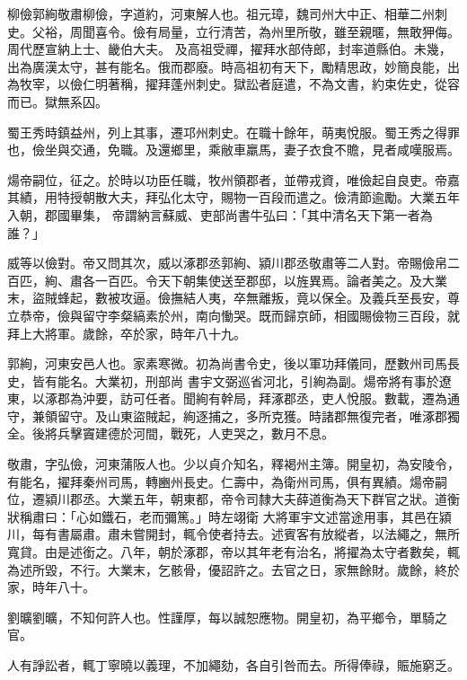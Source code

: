 \begin{pinyinscope}
 柳儉郭絢敬肅柳儉，字道約，河東解人也。祖元璋，魏司州大中正、相華二州刺史。父裕，周聞喜令。儉有局量，立行清苦，為州里所敬，雖至親暱，無敢狎侮。周代歷宣納上士、畿伯大夫。
 及高祖受禪，擢拜水部侍郎，封率道縣伯。未幾，出為廣漢太守，甚有能名。俄而郡廢。時高祖初有天下，勵精思政，妙簡良能，出為牧宰，以儉仁明著稱，擢拜蓬州刺史。獄訟者庭遣，不為文書，約束佐史，從容而已。獄無系囚。



 蜀王秀時鎮益州，列上其事，遷邛州刺史。在職十餘年，萌夷悅服。蜀王秀之得罪也，儉坐與交通，免職。及還鄉里，乘敝車羸馬，妻子衣食不贍，見者咸嘆服焉。



 煬帝嗣位，征之。於時以功臣任職，牧州領郡者，並帶戎資，唯儉起自良吏。帝嘉其績，用特授朝散大夫，拜弘化太守，賜物一百段而遣之。儉清節逾勵。大業五年入朝，郡國畢集，
 帝謂納言蘇威、吏部尚書牛弘曰：「其中清名天下第一者為誰？」



 威等以儉對。帝又問其次，威以涿郡丞郭絢、潁川郡丞敬肅等二人對。帝賜儉帛二百匹，絢、肅各一百匹。令天下朝集使送至郡邸，以旌異焉。論者美之。及大業末，盜賊蜂起，數被攻逼。儉撫結人夷，卒無離叛，竟以保全。及義兵至長安，尊立恭帝，儉與留守李粲縞素於州，南向慟哭。既而歸京師，相國賜儉物三百段，就拜上大將軍。歲餘，卒於家，時年八十九。



 郭絢，河東安邑人也。家素寒微。初為尚書令史，後以軍功拜儀同，歷數州司馬長史，皆有能名。大業初，刑部尚
 書宇文弼巡省河北，引絢為副。煬帝將有事於遼東，以涿郡為沖要，訪可任者。聞絢有幹局，拜涿郡丞，吏人悅服。數載，遷為通守，兼領留守。及山東盜賊起，絢逐捕之，多所克獲。時諸郡無復完者，唯涿郡獨全。後將兵擊竇建德於河間，戰死，人吏哭之，數月不息。



 敬肅，字弘儉，河東蒲阪人也。少以貞介知名，釋褐州主簿。開皇初，為安陵令，有能名，擢拜秦州司馬，轉豳州長史。仁壽中，為衛州司馬，俱有異績。煬帝嗣位，遷潁川郡丞。大業五年，朝東都，帝令司隸大夫薛道衡為天下群官之狀。道衡狀稱肅曰：「心如鐵石，老而彌篤。」時左翊衛
 大將軍宇文述當途用事，其邑在潁川，每有書屬肅。肅未嘗開封，輒令使者持去。述賓客有放縱者，以法繩之，無所寬貸。由是述銜之。八年，朝於涿郡，帝以其年老有治名，將擢為太守者數矣，輒為述所毀，不行。大業末，乞骸骨，優詔許之。去官之日，家無餘財。歲餘，終於家，時年八十。



 劉曠劉曠，不知何許人也。性謹厚，每以誠恕應物。開皇初，為平鄉令，單騎之官。



 人有諍訟者，輒丁寧曉以義理，不加繩劾，各自引咎而去。所得俸祿，賑施窮乏。




\end{pinyinscope}
